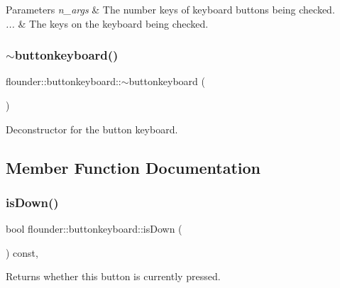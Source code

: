 \begin{DoxyParams}{Parameters}
{\em n\+\_\+args} & The number keys of keyboard buttons being checked. \\
\hline
{\em ...} & The keys on the keyboard being checked. \\
\hline
\end{DoxyParams}
\mbox{\label{classflounder_1_1buttonkeyboard_a76e965d16462442aaae33fe6fd2421ea}} 
\subsubsection{\texorpdfstring{$\sim$buttonkeyboard()}{~buttonkeyboard()}}
{\footnotesize\ttfamily flounder\+::buttonkeyboard\+::$\sim$buttonkeyboard (\begin{DoxyParamCaption}{ }\end{DoxyParamCaption})}



Deconstructor for the button keyboard. 



\subsection{Member Function Documentation}
\mbox{\label{classflounder_1_1buttonkeyboard_a401cfc086e9729adbf8ac3c72ae59fca}} 
\subsubsection{\texorpdfstring{is\+Down()}{isDown()}}
{\footnotesize\ttfamily bool flounder\+::buttonkeyboard\+::is\+Down (\begin{DoxyParamCaption}{ }\end{DoxyParamCaption}) const\hspace{0.3cm}{\ttfamily [override]}, {\ttfamily [virtual]}}



Returns whether this button is currently pressed. 

